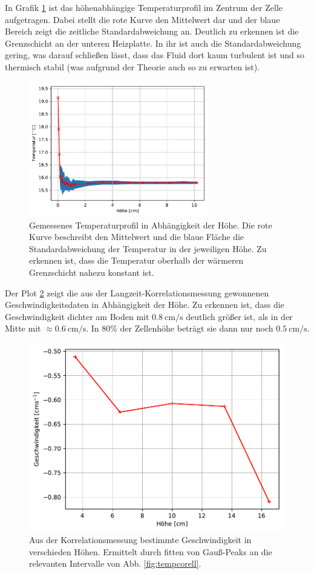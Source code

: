 \documentclass[12pt,a4paper,titlepage,headinclude]{scrartcl}
\numberwithin{equation}{subsection}
\begin{document}
In Grafik \ref{fig:temp_profil} ist das höhenabhängige Temperaturprofil im Zentrum der Zelle aufgetragen.
Dabei stellt die rote Kurve den Mittelwert dar und der blaue Bereich zeigt die zeitliche Standardabweichung an.
Deutlich zu erkennen ist die Grenzschicht an der unteren Heizplatte.
In ihr ist auch die Standardabweichung gering, was darauf schließen lässt, dass das Fluid dort kaum turbulent ist und so thermisch stabil (was aufgrund der Theorie auch so zu erwarten ist).
\begin{figure}[!ht]
\centering
\includegraphics[width=0.7\textwidth]{temp_profil}
\caption{Gemessenes Temperaturprofil in Abhängigkeit der Höhe. Die rote Kurve beschreibt den Mittelwert und die blaue Fläche die Standardabweichung der Temperatur in der jeweiligen Höhe. Zu erkennen ist, dass die Temperatur oberhalb der wärmeren Grenzschicht nahezu konstant ist.}
\label{fig:temp_profil}
\end{figure}

Der Plot \ref{fig:v_hoehe} zeigt die aus der Langzeit-Korrelationsmessung gewonnenen Geschwindigkeitsdaten in Abhängigkeit der Höhe.
Zu erkennen ist, dass die Geschwindigkeit dichter am Boden mit $\SI{0.8}{\centi\meter\per\second}$ deutlich größer ist, als in der Mitte mit $\approx\SI{0.6}{\centi\meter\per\second}$.
In 80\% der Zellenhöhe beträgt sie dann nur noch $\SI{0.5}{\centi\meter\per\second}$.
\begin{figure}[h]
	\centering
	\includegraphics[width=0.7\linewidth]{v_hoehe}
	\caption{Aus der Korrelationsmessung bestimmte Geschwindigkeit in verschieden Höhen. Ermittelt durch fitten von Gauß-Peaks an die relevanten Intervalle von Abb. \ref{fig:tempcorell}.}
	\label{fig:v_hoehe}
\end{figure}
\end{document}
